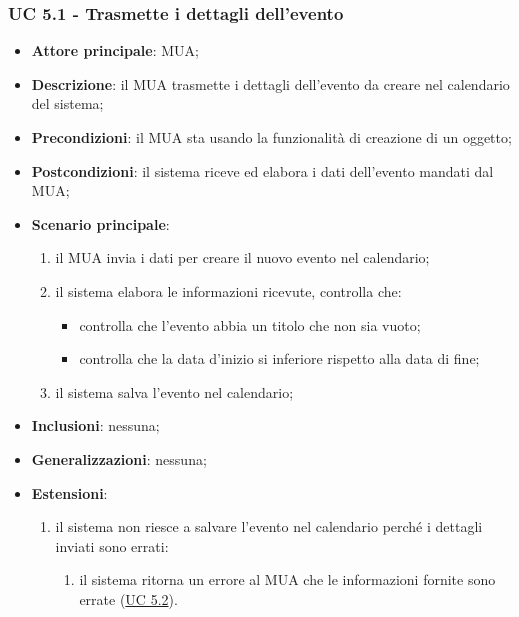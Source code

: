 \subsubsection{UC 5.1 - Trasmette i dettagli dell'evento} \label{sec:UC5.1}
    \begin{itemize}
        \item \textbf{Attore principale}: MUA;
        \item \textbf{Descrizione}: il MUA trasmette i dettagli dell'evento da creare nel calendario del sistema;
        \item \textbf{Precondizioni}: il MUA sta usando la funzionalità di creazione di un oggetto;
        \item \textbf{Postcondizioni}: il sistema riceve ed elabora i dati dell'evento mandati dal MUA;
        \item \textbf{Scenario principale}:
            \begin{enumerate}
                \item il MUA invia i dati per creare il nuovo evento nel calendario;
                \item il sistema elabora le informazioni ricevute, controlla che:
                \begin{itemize}
                    \item controlla che l'evento abbia un titolo che non sia vuoto;
                    \item controlla che la data d'inizio si inferiore rispetto alla data di fine;
                \end{itemize}
                \item il sistema salva l'evento nel calendario;
            \end{enumerate}
        \item \textbf{Inclusioni}: nessuna;
        \item \textbf{Generalizzazioni}: nessuna;
        \item \textbf{Estensioni}:
            \begin{enumerate}[label=\alph*.]
                \item il sistema non riesce a salvare l'evento nel calendario perché i dettagli inviati sono errati:
                \begin{enumerate}[label=\arabic*.]
                    \item il sistema ritorna un errore al MUA che le informazioni fornite sono errate (\hyperref[sec:UC5.2]{UC 5.2}).
                \end{enumerate}
            \end{enumerate}
    \end{itemize}

